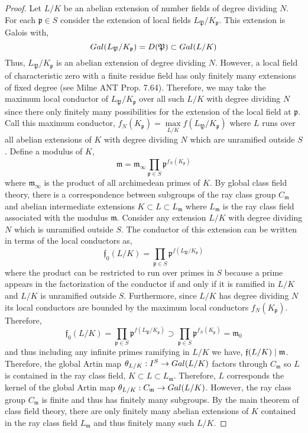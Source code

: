\documentclass[12pt]{extarticle}
\begin{document}
\begin{proof}
Let $L / K$ be an abelian extension of number fields of degree dividing $N$. For each $\mathfrak{p} \in S$ consider the extension of local fields $L_{\mathfrak{P}} / K_{\mathfrak{p}}$. This extension is Galois with, 
\[Gal \small(L_{\mathfrak{P}} / K_{\mathfrak{p}} \small) = D(\mathfrak{P}) \subset Gal \small(L / K \small)\]
Thus, $L_{\mathfrak{P}} / K_{\mathfrak{p}}$ is an abelian extension of degree dividing $N$. However, a local field of  characteristic zero with a finite residue field has only finitely many extensions of fixed degree (see Milne ANT Prop. 7.64). Therefore, we may take the maximum local conductor of $L_{\mathfrak{P}} / K_{\mathfrak{p}}$ over all such $L / K$ with degree dividing $N$ since there only finitely many possibilities for the extension of the local field at $\mathfrak{p}$. Call this maximum conductor, $f_N(K_{\mathfrak{p}}) = \max\limits_{L / K} f(L_{\mathfrak{P}} / K_{\mathfrak{p}})$ where $L$ runs over all abelian extensions of $K$ with degree dividing $N$ which are unramified outside $S$. Define a modulus of $K$,
\[ \mathfrak{m} = \mathfrak{m}_{\infty} \prod_{\mathfrak{p} \in S} \mathfrak{p}^{f_N(K_{\mathfrak{p}})} \]
where $\mathfrak{m}_{\infty}$ is the product of all archimedean primes of $K$.
By global class field theory, there is a correspondence between subgroups of the ray class group $C_{\mathfrak{m}}$ and abelian intermediate extensions $K \subset L \subset L_{\mathfrak{m}}$ where $L_{\mathfrak{m}}$ is the ray class field associated with the modulus $\mathfrak{m}$. Consider any extension $L / K$ with degree dividing $N$ which is unramified outside $S$. The conductor of this extension can be written in terms of the local conductors as,
\[ \mathfrak{f}_0(L / K) = \prod_{\mathfrak{p} \in S} \mathfrak{p}^{f(L_{\mathfrak{P}} / K_{\mathfrak{p}})} \]
where the product can be restricted to run over primes in $S$ because a prime appears in the factorization of the conductor if and only if it is ramified in $L/K$ and $L/K$ is unramified outside $S$. Furthermore, since $L/K$ has degree dividing $N$ its local conductors are bounded by the maximum local conductors $f_N(K_{\mathfrak{p}})$. Therefore,
\[  \mathfrak{f}_0(L / K) = \prod_{\mathfrak{p} \in S} \mathfrak{p}^{f(L_{\mathfrak{P}} / K_{\mathfrak{p}})} \supset \prod_{\mathfrak{p} \in S} \mathfrak{p}^{f_N(K_{\mathfrak{p}})} = \mathfrak{m}_0 \]
and thus including any infinite primes ramifying in $L/K$ we have, $\mathfrak{f}(L / K) \mid \mathfrak{m}$. Therefore, the global Artin map $\theta_{L/K} : I^S \to Gal \small(L/K \small)$ factors through $C_{\mathfrak{m}}$ so $L$ is contained in the ray class field, $K \subset L \subset L_{\mathfrak{m}}$. Therefore, $L$ corresponds the kernel of the global Artin map $\theta_{L/K} : C_{\mathfrak{m}} \to Gal \small(L/K \small)$. However, the ray class group $C_{\mathfrak{m}}$ is finite and thus has finitely many subgroups. By the main theorem of class field theory, there are only finitely many abelian extensions of $K$ contained in the ray class field $L_{\mathfrak{m}}$ and thus finitely many such $L / K$.
\end{proof}
\end{document}
